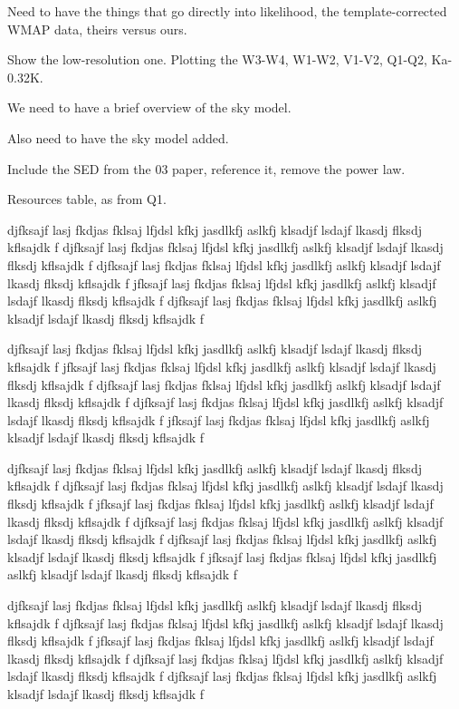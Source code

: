 \documentclass[twocolumn]{../../common/aa}
\begin{document}




Need to have the things that go directly into likelihood, the template-corrected WMAP data, theirs versus ours.

Show the low-resolution one. Plotting the W3-W4, W1-W2, V1-V2, Q1-Q2, Ka-0.32K.

We need to have a brief overview of the sky model.

Also need to have the sky model added.

Include the SED from the 03 paper, reference it, remove the power law.

Resources table, as from Q1.

djfksajf lasj fkdjas fklsaj lfjdsl kfkj jasdlkfj aslkfj klsadjf lsdajf lkasdj flksdj kflsajdk f
djfksajf lasj fkdjas fklsaj lfjdsl kfkj jasdlkfj aslkfj klsadjf lsdajf lkasdj flksdj kflsajdk f
djfksajf lasj fkdjas fklsaj lfjdsl kfkj jasdlkfj aslkfj klsadjf lsdajf lkasdj flksdj kflsajdk f
jfksajf lasj fkdjas fklsaj lfjdsl kfkj jasdlkfj aslkfj klsadjf lsdajf lkasdj flksdj kflsajdk f
djfksajf lasj fkdjas fklsaj lfjdsl kfkj jasdlkfj aslkfj klsadjf lsdajf lkasdj flksdj kflsajdk f

djfksajf lasj fkdjas fklsaj lfjdsl kfkj jasdlkfj aslkfj klsadjf lsdajf lkasdj flksdj kflsajdk f
jfksajf lasj fkdjas fklsaj lfjdsl kfkj jasdlkfj aslkfj klsadjf lsdajf lkasdj flksdj kflsajdk f
djfksajf lasj fkdjas fklsaj lfjdsl kfkj jasdlkfj aslkfj klsadjf lsdajf lkasdj flksdj kflsajdk f
djfksajf lasj fkdjas fklsaj lfjdsl kfkj jasdlkfj aslkfj klsadjf lsdajf lkasdj flksdj kflsajdk f
jfksajf lasj fkdjas fklsaj lfjdsl kfkj jasdlkfj aslkfj klsadjf lsdajf lkasdj flksdj kflsajdk f

djfksajf lasj fkdjas fklsaj lfjdsl kfkj jasdlkfj aslkfj klsadjf lsdajf lkasdj flksdj kflsajdk f
djfksajf lasj fkdjas fklsaj lfjdsl kfkj jasdlkfj aslkfj klsadjf lsdajf lkasdj flksdj kflsajdk f
jfksajf lasj fkdjas fklsaj lfjdsl kfkj jasdlkfj aslkfj klsadjf lsdajf lkasdj flksdj kflsajdk f
djfksajf lasj fkdjas fklsaj lfjdsl kfkj jasdlkfj aslkfj klsadjf lsdajf lkasdj flksdj kflsajdk f
djfksajf lasj fkdjas fklsaj lfjdsl kfkj jasdlkfj aslkfj klsadjf lsdajf lkasdj flksdj kflsajdk f
jfksajf lasj fkdjas fklsaj lfjdsl kfkj jasdlkfj aslkfj klsadjf lsdajf lkasdj flksdj kflsajdk f

djfksajf lasj fkdjas fklsaj lfjdsl kfkj jasdlkfj aslkfj klsadjf lsdajf lkasdj flksdj kflsajdk f
djfksajf lasj fkdjas fklsaj lfjdsl kfkj jasdlkfj aslkfj klsadjf lsdajf lkasdj flksdj kflsajdk f
jfksajf lasj fkdjas fklsaj lfjdsl kfkj jasdlkfj aslkfj klsadjf lsdajf lkasdj flksdj kflsajdk f
djfksajf lasj fkdjas fklsaj lfjdsl kfkj jasdlkfj aslkfj klsadjf lsdajf lkasdj flksdj kflsajdk f
djfksajf lasj fkdjas fklsaj lfjdsl kfkj jasdlkfj aslkfj klsadjf lsdajf lkasdj flksdj kflsajdk f
\end{document}
